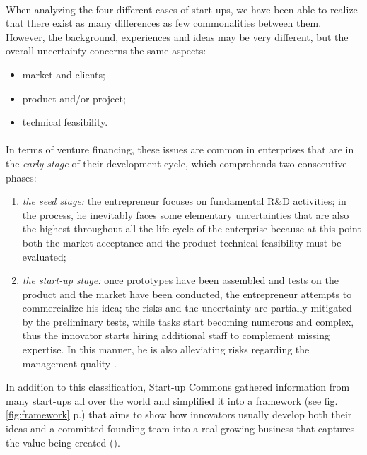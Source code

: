 \documentclass[twoside]{report}
\begin{document}
	\paragraph{}
	When analyzing the four different cases of start-ups, we have been able to realize that there exist as many differences as few commonalities between them. However, the background, experiences and ideas may be very different, but the overall uncertainty concerns the same aspects:
	\begin{itemize}
		\item market and clients;
		\item product and/or project;
		\item technical feasibility.
	\end{itemize}
	\paragraph{}
	In terms of venture financing, these issues are common in enterprises that are in the \emph{early stage} of their development cycle, which comprehends two consecutive phases: 
	\begin{enumerate}
		\item \emph{the seed stage:} the entrepreneur focuses on fundamental R\&D activities; in the process, he inevitably faces some elementary uncertainties that are also the highest throughout all the life-cycle of the enterprise because at this point both the market acceptance and the product technical feasibility must be evaluated;
		\item \emph{the start-up stage:} once prototypes have been assembled and tests on the product and the market have been conducted, the entrepreneur attempts to commercialize his idea; the risks and the uncertainty are partially mitigated by the preliminary tests, while tasks start becoming numerous and complex, thus the innovator starts hiring additional staff to complement missing expertise. In this manner, he is also alleviating risks regarding the management quality \cite{eckermann_venture_2006}.
	\end{enumerate}
	In addition to this classification, Start-up Commons gathered information from many start-ups all over the world and simplified it into a framework (see fig. \ref{fig:framework} p.\pageref{fig:framework}) that aims to show how innovators usually develop both their ideas and a committed founding team into a real growing business that captures the value being created (\cite{commons_startup_2015}).
\end{document}
